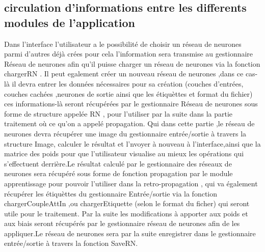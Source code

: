 \documentclass{article}
\begin{document}
	\subsection{circulation d'informations entre les differents modules de l'application}
	
	Dans l'interface l'utilisateur a le possibilité de choisir un réseau de neurones parmi d'autres déjà crées pour cela l'information sera transmise au gestionnaire Réseau de neurones afin qu'il puisse charger un réseau de neurones via la fonction chargerRN .
	Il peut egalement créer un nouveau réseau de neurones ,dans ce cas-là il devra entrer les données nécessaires pour sa création (couches d'entrées, couches cachées ,neurones de sortie ainsi que les étiquèttes et format du fichier) ces informations-là seront récupérées par le gestionnaire Réseau de neurones sous forme de structure appelée RN , pour l'utiliser par la suite dans la partie traitement où ce qu'on a appelé propagation.
	Qui dans cette partie ,le réseau de neurones devra récupérer une image du gestionnaire entrée/sortie à travers la structure Image, calculer le résultat et l'nvoyer à nouveau à l'interface,ainsi que la matrice des poids pour que l'utilisateur visualise au mieux les opérations qui s'effectuent derrière.Le résultat calculé par le gestionnaire des réseaux de neurones sera récupéré sous forme de fonction propagation par le module apprentissage pour pouvoir l'utiliser dans la retro-propagation ,
	qui va également récupérer les étiquèttes du gestionnaire Entrée/sortie via la fonction chargerCoupleAttIn ,ou chargerEtiquette (selon le format du ficher) qui seront utile pour le traitement.
	Par la suite les modifications à apporter aux poids et aux biais seront récupérés par le gestionnaire réseau de neurones afin de les appliquer.Le réseau de neurones sera par la suite enregistrer dans le gestionnaire entrée/sortie à travers la fonction SaveRN.
		
		
\end{document}
